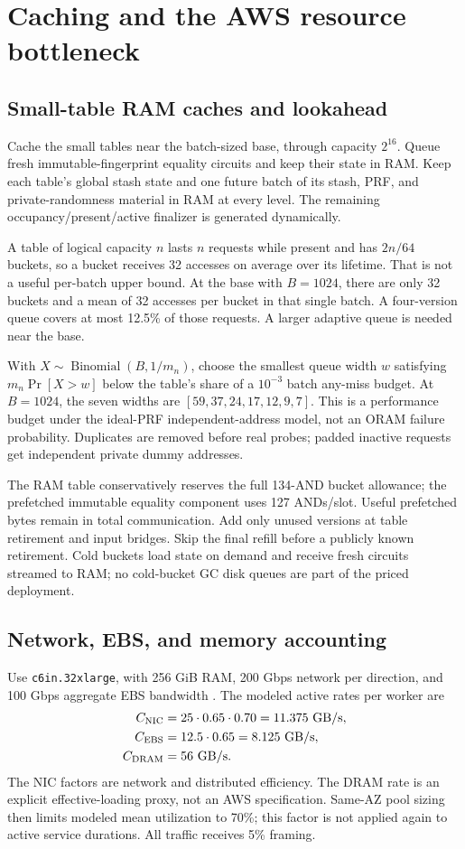 \documentclass[11pt]{article}
\begin{document}
\section{Caching and the AWS resource bottleneck}
\subsection{Small-table RAM caches and lookahead}
Cache the small tables near the batch-sized base, through capacity $2^{16}$.
Queue fresh immutable-fingerprint equality circuits and keep their state
in RAM. Keep each table's global stash state and one future batch of its
stash, PRF, and private-randomness material in RAM at every level. The
remaining occupancy/present/active finalizer is generated dynamically.

A table of logical capacity $n$ lasts $n$ requests while present and has
$2n/64$ buckets, so a bucket receives 32 accesses on average over its
lifetime. That is not a useful per-batch upper bound. At the base with
$B=1024$, there are only 32 buckets and a mean of 32 accesses per bucket
in that single batch. A four-version queue covers at most 12.5\% of those
requests. A larger adaptive queue is needed near the base.

With $X\sim\operatorname{Binomial}(B,1/m_n)$, choose the smallest queue
width $w$ satisfying $m_n\Pr[X>w]$ below the table's share of a $10^{-3}$
batch any-miss budget. At $B=1024$, the seven widths are
$[59,37,24,17,12,9,7]$. This is a performance budget under the ideal-PRF
independent-address model, not an ORAM failure probability. Duplicates are
removed before real probes; padded inactive requests get independent
private dummy addresses.


The RAM table conservatively reserves the full 134-AND bucket allowance;
the prefetched immutable equality component uses 127 ANDs/slot. Useful
prefetched bytes remain in total communication. Add only unused versions
at table retirement and input bridges. Skip the final refill before a
publicly known retirement. Cold buckets load state on demand and receive
fresh circuits streamed to RAM; no cold-bucket GC disk queues are part of
the priced deployment.

\subsection{Network, EBS, and memory accounting}
Use \texttt{c6in.32xlarge}, with 256 GiB RAM, 200 Gbps network per direction,
and 100 Gbps aggregate EBS bandwidth \cite{aws-compute,aws-network}. The
modeled active rates per worker are
\begin{align*}
 C_{\rm NIC}&=25\cdot0.65\cdot0.70=11.375\ {\rm GB/s},\\
 C_{\rm EBS}&=12.5\cdot0.65=8.125\ {\rm GB/s},\\
 C_{\rm DRAM}&=56\ {\rm GB/s}.
\end{align*}
The NIC factors are network and distributed efficiency. The DRAM rate is
an explicit effective-loading proxy, not an AWS specification. Same-AZ pool sizing
then limits modeled mean utilization to 70\%; this factor is not applied
again to active service durations. All traffic receives 5\% framing.
\end{document}

